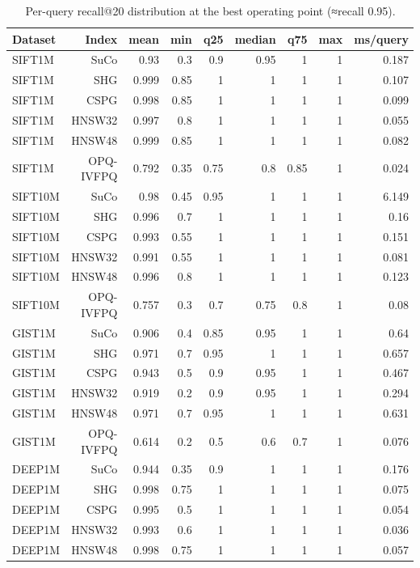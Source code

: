 \begin{table}[t]
\centering
\small
\caption{Per-query recall@20 distribution at the best operating point (≈recall 0.95).}
\label{tab:robustness}
\begin{tabular}{lrrrrrrrr}
\toprule
Dataset & Index & mean & min & q25 & median & q75 & max & ms/query \\
\midrule
SIFT1M & SuCo & 0.93 & 0.3 & 0.9 & 0.95 & 1 & 1 & 0.187 \\
SIFT1M & SHG & 0.999 & 0.85 & 1 & 1 & 1 & 1 & 0.107 \\
SIFT1M & CSPG & 0.998 & 0.85 & 1 & 1 & 1 & 1 & 0.099 \\
SIFT1M & HNSW32 & 0.997 & 0.8 & 1 & 1 & 1 & 1 & 0.055 \\
SIFT1M & HNSW48 & 0.999 & 0.85 & 1 & 1 & 1 & 1 & 0.082 \\
SIFT1M & OPQ-IVFPQ & 0.792 & 0.35 & 0.75 & 0.8 & 0.85 & 1 & 0.024 \\
SIFT10M & SuCo & 0.98 & 0.45 & 0.95 & 1 & 1 & 1 & 6.149 \\
SIFT10M & SHG & 0.996 & 0.7 & 1 & 1 & 1 & 1 & 0.16 \\
SIFT10M & CSPG & 0.993 & 0.55 & 1 & 1 & 1 & 1 & 0.151 \\
SIFT10M & HNSW32 & 0.991 & 0.55 & 1 & 1 & 1 & 1 & 0.081 \\
SIFT10M & HNSW48 & 0.996 & 0.8 & 1 & 1 & 1 & 1 & 0.123 \\
SIFT10M & OPQ-IVFPQ & 0.757 & 0.3 & 0.7 & 0.75 & 0.8 & 1 & 0.08 \\
GIST1M & SuCo & 0.906 & 0.4 & 0.85 & 0.95 & 1 & 1 & 0.64 \\
GIST1M & SHG & 0.971 & 0.7 & 0.95 & 1 & 1 & 1 & 0.657 \\
GIST1M & CSPG & 0.943 & 0.5 & 0.9 & 0.95 & 1 & 1 & 0.467 \\
GIST1M & HNSW32 & 0.919 & 0.2 & 0.9 & 0.95 & 1 & 1 & 0.294 \\
GIST1M & HNSW48 & 0.971 & 0.7 & 0.95 & 1 & 1 & 1 & 0.631 \\
GIST1M & OPQ-IVFPQ & 0.614 & 0.2 & 0.5 & 0.6 & 0.7 & 1 & 0.076 \\
DEEP1M & SuCo & 0.944 & 0.35 & 0.9 & 1 & 1 & 1 & 0.176 \\
DEEP1M & SHG & 0.998 & 0.75 & 1 & 1 & 1 & 1 & 0.075 \\
DEEP1M & CSPG & 0.995 & 0.5 & 1 & 1 & 1 & 1 & 0.054 \\
DEEP1M & HNSW32 & 0.993 & 0.6 & 1 & 1 & 1 & 1 & 0.036 \\
DEEP1M & HNSW48 & 0.998 & 0.75 & 1 & 1 & 1 & 1 & 0.057 \\

\end{tabular}
\end{table}
